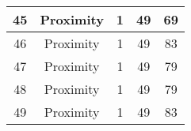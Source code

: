 \documentclass[results.tex]{subfiles}
\begin{document}
\begin{center}
\begin{tabular}{| c || c | c | c | c |}
            \hline
            45                      & Proximity                    & 1                      & 49                      & 69                   \\
            \hline
            46                      & Proximity                    & 1                      & 49                      & 83                   \\
            \hline
            47                      & Proximity                    & 1                      & 49                      & 79                   \\
            \hline
            48                      & Proximity                    & 1                      & 49                      & 79                   \\
            \hline
            49                      & Proximity                    & 1                      & 49                      & 83                   \\
            \hline
        \end{tabular}
    \end{center}
\end{document}
